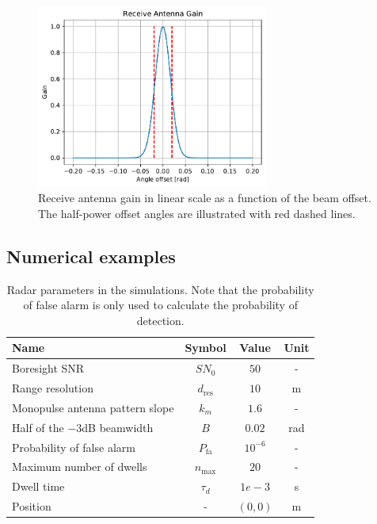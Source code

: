 \documentclass[english, 12pt, a4paper, elec, utf8, a-1b, online]{aaltothesis}
\begin{document}
\begin{figure}[t]
    \centering
    \includegraphics[width=0.68\textwidth]{figures/benchmark/rx_antenna_gain.pdf}
    \caption{Receive antenna gain in linear scale as a function of the beam offset. 
    The half-power offset angles are illustrated with red dashed lines.}
    \label{fig:beamwidth}
\end{figure}

\subsection{Numerical examples}\label{sec:ri_setup}


\bgroup
\def \arraystretch{1.25}
\begin{table}[tb]
    \centering
    \begin{tabular}{|l|c|c|c|}
    \hline
    \textbf{Name}              & \textbf{Symbol} & \textbf{Value}  & \textbf{Unit}\\ \hline
    Boresight SNR              & $SN_0$          & $50$ & -          \\ \hline
    Range resolution            & $d_\text{res}$  & $10$ & m  \\ \hline
    Monopulse antenna pattern slope  & $k_m$      & $1.6$ & -  \\ \hline
    Half of the $-3$dB beamwidth & $B$             & $0.02$ & rad         \\ \hline
    Probability of false alarm & $P_\text{fa}$   & $10^{-6}$ & -      \\ \hline
    Maximum number of dwells   & $n_\text{max}$  & $20$ & -  \\ \hline
    Dwell time                 & $\tau_d$          & $1e-3$ & s   \\ \hline
    Position                   & -               & $(0, 0)$ & m \\ \hline
    \end{tabular}
    \caption{Radar parameters in the simulations. Note that the probability of false alarm is only used to calculate the probability of detection.}
    \label{tab:radar_parameters}
\end{table}
\egroup
\end{document}
